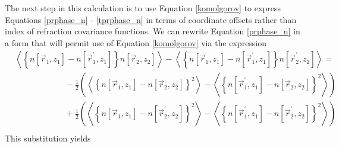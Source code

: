 The next step in this calculation is to use Equation \ref{komolgorov}
to express Equations \ref{prphase_n} - \ref{tprphase_n} in terms of
coordinate offsets rather than index of refraction covariance
functions.  We can rewrite Equation \ref{prphase_n} in a form that
will permit use of Equation \ref{komolgorov} via the expression
\begin{equation}\label{simplify}
\begin{split}
&\left\langle \left\{n\left[\vec{r}_{1},z_{1}\right] - n\left[\vec{r}^{\prime}_{1},z_{1}\right]\right\}n\left[\vec{r}_{2},z_{2}\right]\right\rangle -
\left\langle \left\{n\left[\vec{r}_{1},z_{1}\right] - n\left[\vec{r}^{\prime}_{1},z_{1}\right]\right\}n\left[\vec{r}^{\prime}_{2},z_{2}\right]\right\rangle = \\
&\quad\quad\quad\quad\quad\quad
-\frac{1}{2} \left(\left\langle \left\{n\left[\vec{r}_{1},z_{1}\right] - n\left[\vec{r}_{2},z_{2}\right]\right\}^{2}\right\rangle - 
\left\langle \left\{n\left[\vec{r}^{\prime}_{1},z_{1}\right] - n\left[\vec{r}_{2},z_{2}\right]\right\}^{2}\right\rangle\right) \\
&\quad\quad\quad\quad\quad\quad
+\frac{1}{2} \left(\left\langle \left\{n\left[\vec{r}_{1},z_{1}\right] - n\left[\vec{r}^{\prime}_{2},z_{2}\right]\right\}^{2}\right\rangle - 
\left\langle \left\{n\left[\vec{r}^{\prime}_{1},z_{1}\right] - n\left[\vec{r}^{\prime}_{2},z_{2}\right]\right\}^{2}\right\rangle\right) \\
\end{split}
\end{equation}
This substitution yields
